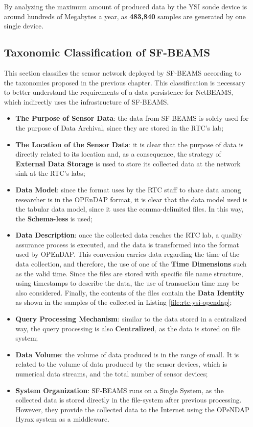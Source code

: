 By analyzing the maximum amount of produced data by the YSI sonde device is
around hundreds of Megabytes a year, as \textbf{483,840} samples are generated
by one single device. 

\subsection{Taxonomic Classification of SF-BEAMS}

This section classifies the sensor network deployed by SF-BEAMS according to
the taxonomies proposed in the previous chapter. This classification is
necessary to better understand the requirements of a data persistence for
NetBEAMS, which indirectly uses the infrastructure of SF-BEAMS.

\begin{itemize}
  \item \textbf{The Purpose of Sensor Data}: the data from SF-BEAMS is solely
  used for the purpose of Data Archival, since they are stored in the RTC's
  lab;
  \item \textbf{The Location of the Sensor Data}: it is clear that the purpose
  of data is directly related to its location and, as a consequence, the
  strategy of \textbf{External Data Storage} is used to store its collected
  data at the network sink at the RTC's labs;
  \item \textbf{Data Model}: since the format uses by the RTC staff to share
  data among researcher is in the OPEnDAP format, it is clear that the data
  model used is the tabular data model, since it uses the comma-delimited
  files. In this way, the \textbf{Schema-less} is used;
  \item \textbf{Data Description}: once the collected data reaches the RTC
  lab, a quality assurance process is executed, and the data is transformed
  into the format used by OPEnDAP. This conversion carries data regarding
  the time of the data collection, and therefore, the use of one of the
  \textbf{Time Dimensions} such as the valid time. Since the files are stored
  with specific file name structure, using timestamps to describe the data, the
  use of transaction time may be also considered. Finally, the contents of the
  files contain the \textbf{Data Identity} as shown in the samples of
  the collected in Listing \ref{file:rtc-ysi-opendap};
  \item \textbf{Query Processing Mechanism}: similar to the data stored in a
  centralized way, the query processing is also \textbf{Centralized}, as the
  data is stored on file system;
  \item \textbf{Data Volume}: the volume of data produced is in the range of
  small. It is related to the volume of data produced by the sensor devices,
  which is numerical data streams, and the total number of sensor devices;
  \item \textbf{System Organization}: SF-BEAMS runs on a Single System, as
  the collected data is stored directly in the file-system after previous 
  processing. However, they provide the collected data to the Internet using
  the OPeNDAP Hyrax system as a middleware.
\end{itemize}


